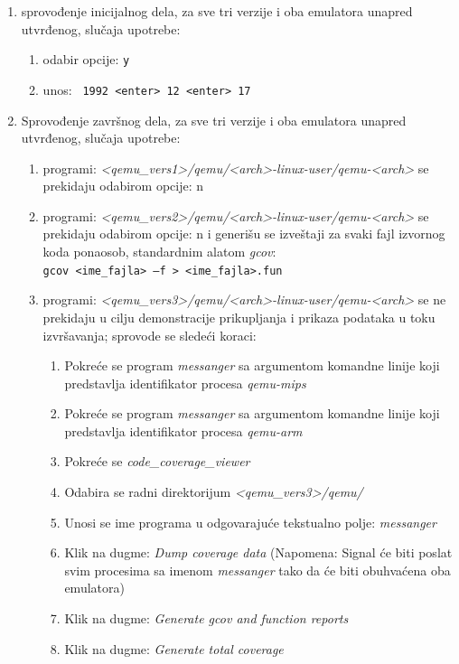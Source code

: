 \documentclass[12pt,oneside]{memoir}
\newcommand{\kod}[1]{\texttt{#1}}
\newcommand{\strano}[1]{\textit{#1}}
\begin{document}
\begin{enumerate}
\item sprovođenje inicijalnog dela, za sve tri verzije i oba emulatora unapred utvrđenog, slučaja upotrebe:
\begin{enumerate}
\item odabir opcije: \kod{y}
\item unos: \kod{ 1992 <enter> 12 <enter> 17}
\end{enumerate}

\item Sprovođenje završnog dela, za sve tri verzije i oba emulatora unapred utvrđenog, slučaja upotrebe:
\begin{enumerate}
\item programi: \strano{<qemu\_vers1>/qemu/<arch>-linux-user/qemu-<arch>} se prekidaju odabirom opcije: n
\item programi: \strano{<qemu\_vers2>/qemu/<arch>-linux-user/qemu-<arch>} se prekidaju odabirom opcije: n i generišu se izveštaji za svaki fajl izvornog koda ponaosob, standardnim alatom \strano{gcov}: \\
\kod{gcov <ime\_fajla> –f  > <ime\_fajla>.fun}
\item programi: \strano{<qemu\_vers3>/qemu/<arch>-linux-user/qemu-<arch>} se ne prekidaju u cilju demonstracije prikupljanja i prikaza podataka u toku izvršavanja; sprovode se sledeći koraci:
\begin{enumerate}
\item Pokreće se program \strano{messanger} sa argumentom komandne linije koji predstavlja identifikator procesa \strano{qemu-mips}
\item Pokreće se program \strano{messanger} sa argumentom komandne linije koji predstavlja identifikator procesa \strano{qemu-arm}
\item Pokreće se \strano{code\_coverage\_viewer}
\item Odabira se radni direktorijum \strano{<qemu\_vers3>/qemu/}
\item Unosi se ime programa u odgovarajuće tekstualno polje: \strano{messanger}
\item  Klik na dugme: \strano{Dump coverage data} (Napomena: Signal će biti poslat svim procesima sa imenom \strano{messanger} tako da će biti obuhvaćena oba emulatora)
\item Klik na dugme: \strano{Generate gcov and function reports}
\item Klik na dugme: \strano{Generate total coverage}
\end{enumerate}
\end{enumerate}


\end{enumerate}
\end{document}
